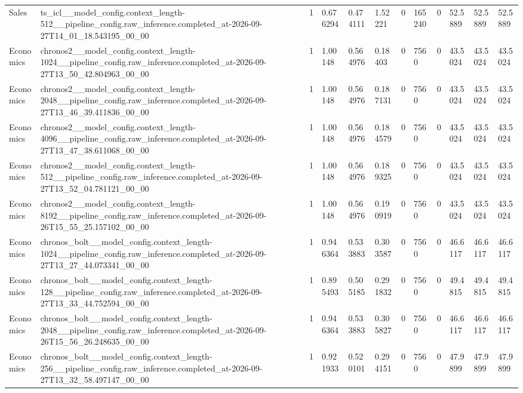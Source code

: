 \begin{tabular}{llllllllllll}
Sales & ts\_icl\_\_model\_config.context\_length-512\_\_pipeline\_config.raw\_inference.completed\_at-2026-09-27T14\_01\_18.543195\_00\_00 & 1 & 0.676294 & 0.474111 & 1.52221 & 0 & 165240 & 0 & 52.5889 & 52.5889 & 52.5889 \\
Economics & chronos2\_\_model\_config.context\_length-1024\_\_pipeline\_config.raw\_inference.completed\_at-2026-09-27T13\_50\_42.804963\_00\_00 & 1 & 1.00148 & 0.564976 & 0.18403 & 0 & 7560 & 0 & 43.5024 & 43.5024 & 43.5024 \\
Economics & chronos2\_\_model\_config.context\_length-2048\_\_pipeline\_config.raw\_inference.completed\_at-2026-09-27T13\_46\_39.411836\_00\_00 & 1 & 1.00148 & 0.564976 & 0.187131 & 0 & 7560 & 0 & 43.5024 & 43.5024 & 43.5024 \\
Economics & chronos2\_\_model\_config.context\_length-4096\_\_pipeline\_config.raw\_inference.completed\_at-2026-09-27T13\_47\_38.611068\_00\_00 & 1 & 1.00148 & 0.564976 & 0.184579 & 0 & 7560 & 0 & 43.5024 & 43.5024 & 43.5024 \\
Economics & chronos2\_\_model\_config.context\_length-512\_\_pipeline\_config.raw\_inference.completed\_at-2026-09-27T13\_52\_04.781121\_00\_00 & 1 & 1.00148 & 0.564976 & 0.189325 & 0 & 7560 & 0 & 43.5024 & 43.5024 & 43.5024 \\
Economics & chronos2\_\_model\_config.context\_length-8192\_\_pipeline\_config.raw\_inference.completed\_at-2026-09-26T15\_55\_25.157102\_00\_00 & 1 & 1.00148 & 0.564976 & 0.190919 & 0 & 7560 & 0 & 43.5024 & 43.5024 & 43.5024 \\
Economics & chronos\_bolt\_\_model\_config.context\_length-1024\_\_pipeline\_config.raw\_inference.completed\_at-2026-09-27T13\_27\_44.073341\_00\_00 & 1 & 0.946364 & 0.533883 & 0.303587 & 0 & 7560 & 0 & 46.6117 & 46.6117 & 46.6117 \\
Economics & chronos\_bolt\_\_model\_config.context\_length-128\_\_pipeline\_config.raw\_inference.completed\_at-2026-09-27T13\_33\_44.752594\_00\_00 & 1 & 0.895493 & 0.505185 & 0.291832 & 0 & 7560 & 0 & 49.4815 & 49.4815 & 49.4815 \\
Economics & chronos\_bolt\_\_model\_config.context\_length-2048\_\_pipeline\_config.raw\_inference.completed\_at-2026-09-26T15\_56\_26.248635\_00\_00 & 1 & 0.946364 & 0.533883 & 0.305827 & 0 & 7560 & 0 & 46.6117 & 46.6117 & 46.6117 \\
Economics & chronos\_bolt\_\_model\_config.context\_length-256\_\_pipeline\_config.raw\_inference.completed\_at-2026-09-27T13\_32\_58.497147\_00\_00 & 1 & 0.921933 & 0.520101 & 0.294151 & 0 & 7560 & 0 & 47.9899 & 47.9899 & 47.9899 \\

\end{tabular}
